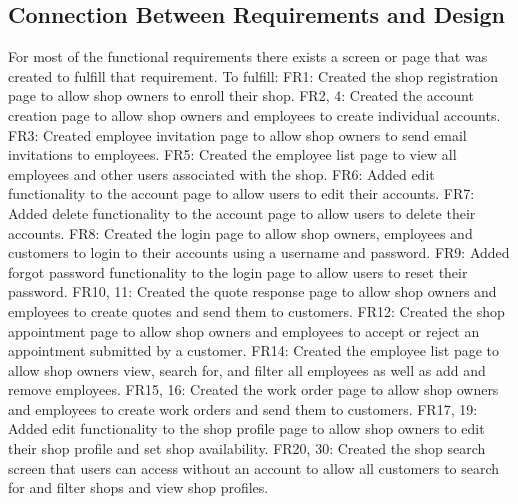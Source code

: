 \documentclass[12pt, titlepage]{article}
\begin{document}
\subsection{Connection Between Requirements and Design} \label{SecConnection}
For most of the functional requirements there exists a screen or page that was created to fulfill that requirement. 
\newline
To fulfill:
\newline
FR1: Created the shop registration page to allow shop owners to enroll their shop.
\newline
FR2, 4: Created the account creation page to allow shop owners and employees to create individual accounts.
\newline
FR3: Created employee invitation page to allow shop owners to send email invitations to employees.
\newline
FR5: Created the employee list page to view all employees and other users associated with the shop.
\newline
FR6: Added edit functionality to the account page to allow users to edit their accounts.
\newline
FR7: Added delete functionality to the account page to allow users to delete their accounts.
\newline
FR8: Created the login page to allow shop owners, employees and customers to login to their accounts using a username and password.
\newline
FR9: Added forgot password functionality to the login page to allow users to reset their password.
\newline
FR10, 11: Created the quote response page to allow shop owners and employees to create quotes and send them to customers.
\newline
FR12: Created the shop appointment page to allow shop owners and employees to accept or reject an appointment submitted by a customer.
\newline
FR14: Created the employee list page to allow shop owners view, search for, and filter all employees as well as add and remove employees.
\newline
FR15, 16: Created the work order page to allow shop owners and employees to create work orders and send them to customers.
\newline
FR17, 19: Added edit functionality to the shop profile page to allow shop owners to edit their shop profile and set shop availability.
\newline
FR20, 30: Created the shop search screen that users can access without an account to allow all customers to search for and filter shops and view shop profiles.
\end{document}
